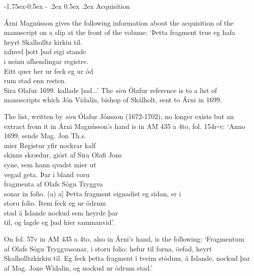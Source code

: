 \documentclass[11pt,twoside]{article}\makeatletter
\makeatletter
\def\ref{}
\renewcommand\subsection{\@startsection{subsection}{2}{\z@}%
     {-1.75ex\@plus -0.5ex \@minus- .2ex}%
     {0.5ex \@plus .2ex}%
     {\reset@font\Large\sffamily}}
\makeatother
\begin{document}
\subsection{Acquisition}
\par
 {\name Árni Magnússon} gives the following information about the acquisition of the manuscript on a slip at the front of the volume: ‘Þetta fragment true eg hafa {\hskip1pt}\\{} heyrt Skalholltz kirkiu til. {\hskip1pt}\\{} iafnvel þott þad eigi stande {\hskip1pt}\\{} i neinu afhendingar registre. {\hskip1pt}\\{} Eitt quer her ur feck eg ur ỏd{\hskip1pt}\\{}rum stad enn resten. {\hskip1pt}\\{} Sira Olafur 1699. kallade þad...’ The \textit{sira} Ólafur reference is to a list of manuscripts which  {\name Jón Vídalín}, bishop of  {\name Skálholt}, sent to Árni in 1699. \par
The list, written by \textit{sira}  {\name Ólafur Jónsson} (1672-1702), no longer exists but an extract from it in Árni Magnússon's hand is in  {\ref AM 435 a 4to}, fol. 154r-v: ‘Anno 1699. sende Mag. Jon Th.s. {\hskip1pt}\\{} mier Registur yfir nockrar kalf{\hskip1pt}\\{}skinns skrædur, giỏrt af Sira Olafi Jons {\hskip1pt}\\{} syne, sem hann qvadst mier ut{\hskip1pt}\\{}vegad geta. Þar i bland voru {\hskip1pt}\\{} fragmenta af Olafs Sỏgu Tryggva{\hskip1pt}\\{}sonar in folio. (a)  a] Þetta fragment eignadist eg sidan, er i {\hskip1pt}\\{} storu folio. Item feck eg ur ỏdrum {\hskip1pt}\\{} stad ä Islande nockud sem heyrde þar {\hskip1pt}\\{} til, og lagde eg þad hier sammanvid’. \par
On fol. 57v in AM 435 a 4to, also in Árni's hand, is the following: ‘Fragmentum af Olafs Sỏgu Tryggvasonar, i storu folio: hefur til forna, öefad, heyrt Skalholltzkirkiu til. Eg feck þetta fragment i tveim stỏdum, ä Islande, nockud þar af Mag. Jone Widalin, og nockud ur ỏdrum stad.’ \par
\end{document}
